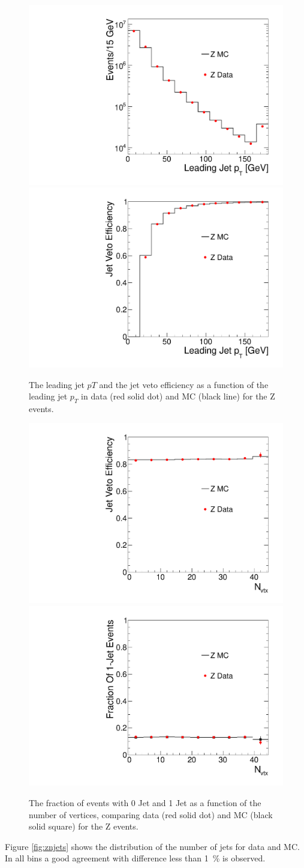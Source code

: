\begin{figure}[!hbtp]
\centering
\includegraphics[width=.45\textwidth]{figures/ZjetpT.pdf}
\includegraphics[width=.45\textwidth]{figures/Zjetvetoeff.pdf}
\caption{The leading jet $pT$  and the jet veto efficiency as a function 
of the leading jet $p_T$  in data (red solid dot) and MC (black line) for the Z events. }
\label{fig:jetveto_z}
\end{figure}
\begin{figure}[!hbtp]
\centering
\includegraphics[width=.45\textwidth]{figures/Zjetvetoeff_vs_nvtx.pdf}
\includegraphics[width=.45\textwidth]{figures/Zonejeteff_vs_nvtx.pdf}
\caption{The fraction of events with 0 Jet  and 1 Jet  
as a function of the number of vertices, comparing data (red solid dot) and MC (black solid square) for the Z events. }
\label{fig:jetfrac_z}
\end{figure}
Figure \ref{fig:znjets} shows the distribution of the number of jets for data and MC. 
In all bins a good agreement with difference less than 1~\% is observed. 

